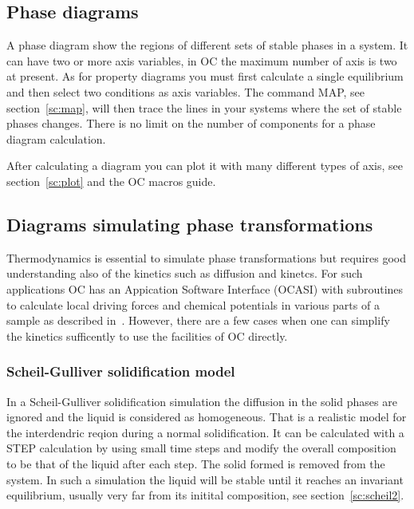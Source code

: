 \documentclass[11pt]{article}
\begin{document}
\hypertarget{Info phasediagram}{}
\subsection{Phase diagrams}

A phase diagram show the regions of different sets of stable phases in
a system.  It can have two or more axis variables, in OC the maximum
number of axis is two at present.  As for property diagrams you must
first calculate a single equilibrium and then select two conditions as
axis variables.  The command MAP, see section~\ref{sc:map}, will then
trace the lines in your systems where the set of stable phases
changes.  There is no limit on the number of components for a phase
diagram calculation.

After calculating a diagram you can plot it with many different types
of axis, see section~\ref{sc:plot} and the OC macros guide.

\subsection{Diagrams simulating phase transformations}

Thermodynamics is essential to simulate phase transformations but
requires good understanding also of the kinetics such as diffusion and
kinetcs.  For such applications OC has an Appication Software
Interface (OCASI) with subroutines to calculate local driving forces
and chemical potentials in various parts of a sample as described
in~\cite{16Sun,20Her}.  However, there are a few cases when one can
simplify the kinetics sufficently to use the facilities of OC
directly.

\subsubsection{Scheil-Gulliver solidification model}\label{sc:scheil1}

In a Scheil-Gulliver solidification simulation the diffusion in the
solid phases are ignored and the liquid is considered as homogeneous.
That is a realistic model for the interdendric reqion during a normal
solidification.  It can be calculated with a STEP calculation by using
small time steps and modify the overall composition to be that of the
liquid after each step.  The solid formed is removed from the system.
In such a simulation the liquid will be stable until it reaches an
invariant equilibrium, usually very far from its initital composition,
see section~\ref{sc:scheil2}.
\end{document}
